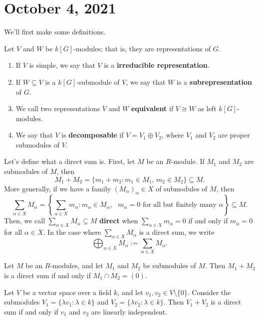 \section{October 4, 2021}
We'll first make some definitions. 

\begin{defn}{} 
    Let $V$ and $W$ be $k[G]$-modules; that is, they are 
    representations of $G$. 
    \begin{enumerate}[(1)]
        \item If $V$ is simple, we say that $V$ is a {\bf irreducible representation}.
        \item If $W \subseteq V$ is a $k[G]$-submodule of $V$, we say that $W$ is a 
        {\bf subrepresentation} of $G$. 
        \item We call two representations $V$ and $W$ {\bf equivalent} if 
        $V \cong W$ as left $k[G]$-modules. 
        \item We say that $V$ is {\bf decomposable} if $V = V_1 \oplus V_2$, 
        where $V_1$ and $V_2$ are proper submodules of $V$. 
    \end{enumerate}
\end{defn}

Let's define what a direct sum is. First, let $M$ be an $R$-module. 
If $M_1$ and $M_2$ are submodules of $M$, then 
\[ M_1 + M_2 = \{m_1 + m_2 : m_1 \in M_1,\, m_2 \in M_2\} \subseteq M. \] 
More generally, if we have a family $(M_\alpha)_\alpha \in X$ of submodules of 
$M$, then 
\[ \sum_{\alpha \in X} M_\alpha = \left\{ \sum_{\alpha \in X} m_\alpha : 
m_\alpha \in M_\alpha, \text{ $m_\alpha = 0$ for all but finitely many 
$\alpha$}\right\} \subseteq M. \] 
Then, we call $\sum_{\alpha \in X} M_\alpha \subseteq M$ 
{\bf direct} when $\sum_{\alpha \in X} m_\alpha = 0$ if and only if 
$m_\alpha = 0$ for all $\alpha \in X$. In the case where 
$\sum_{\alpha \in X} M_\alpha$ is a direct sum, we write 
\[ \bigoplus_{\alpha \in X} M_\alpha := \sum_{\alpha \in X} M_\alpha. \] 

\begin{remark}{}
    Let $M$ be an $R$-modules, and let $M_1$ and $M_2$ be submodules of $M$. 
    Then $M_1 + M_2$ is a direct sum if and only if $M_1 \cap M_2 = (0)$. 
\end{remark} 

\begin{exmp}{}
    Let $V$ be a vector space over a field $k$, and let $v_1, v_2 \in V 
    \setminus \{0\}$. Consider the submodules $V_1 = \{\lambda v_1 : \lambda 
    \in k\}$ and $V_2 = \{\lambda v_2 : \lambda \in k\}$. Then $V_1 + V_2$ is a 
    direct sum if and only if $v_1$ and $v_2$ are linearly independent. 
\end{exmp}

